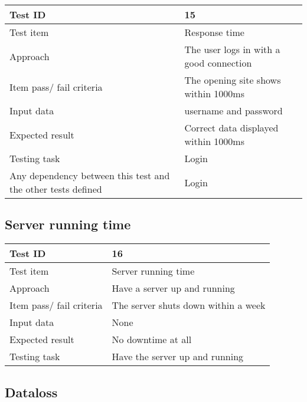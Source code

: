\documentclass[a4paper, english, 12pt]{article}
\begin{document}
\begin{tabularx}{\textwidth}{ |X|X| }
\hline
\rowcolor{Gray}
Test ID & 15 \\ \hline
Test item & Response time \\ \hline
Approach & The user logs in with a good connection \\ \hline
Item pass/ fail criteria & The opening site shows within 1000ms\\ \hline
Input data & 
username and password\\ \hline
Expected result & 
Correct data displayed within 1000ms \\ \hline
Testing task & Login \\ \hline
Any dependency between this test and the other tests defined & Login \\ \hline

\end{tabularx}

\subsection{Server running time}

\begin{tabularx}{\textwidth}{ |X|X| }
\hline
\rowcolor{Gray}
Test ID & 16 \\ \hline
Test item & Server running time \\ \hline
Approach & Have a server up and running \\ \hline
Item pass/ fail criteria & The server shuts down within a week\\ \hline
Input data & None\\ \hline
Expected result & 
No downtime at all\\ \hline
Testing task & Have the server up and running \\ \hline
\end{tabularx}

\subsection{Dataloss}
\end{document}
